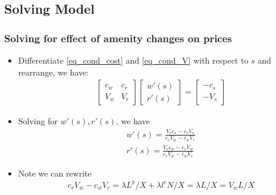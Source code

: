 \documentclass[11pt,notes=hide,aspectratio=169]{beamer}
\begin{document}
\subsection{Solving Model}
\begin{frame}
\frametitle{Solving for effect of amenity changes on prices}
\begin{itemize}
\item Differentiate \eqref{eq_cond_cost} and \eqref{eq_cond_V} with respect to $s$ and rearrange, we have:
\begin{align*}
\begin{bmatrix}
c_w & c_r \\
V_w & V_r
\end{bmatrix}
\begin{bmatrix}
w'(s) \\
r'(s)
\end{bmatrix} = 
\begin{bmatrix}
-c_s\\
-V_s
\end{bmatrix}
\end{align*}
\item Solving for $w'(s), r'(s)$, we have
\begin{align*}
w'(s) = \frac{V_r c_s - c_r V_s}{c_r V_w - c_w V_r} \\
r'(s) = \frac{V_s c_w - c_s V_w}{c_r V_w - c_w V_r} 
\end{align*}
\item Note we can rewrite
\begin{align*}
c_r V_w - c_w V_r = \lambda L^p/X + \lambda l^c N/X = \lambda L/X =V_w L/X
\end{align*}
\end{itemize}
\end{frame}
\end{document}
